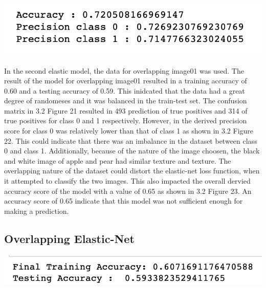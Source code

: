 \documentclass[12pt]{article}
\begin{document}
\begin{multicols*}{2}
\begin{center}
		\includegraphics[scale=0.5]{../screenshot/Non-Overlapping-Elastic-results/calc_score.png}
  \end{center}


  \hspace*{10mm} In the second elastic model, the data for overlapping image01 was used. The result of the model for overlapping
  image01 resulted in a training accuracy of 0.60 and a testing accuracy of 0.59. This inidcated that the data had a great degree of
  randomeses and it was balanced in the train-test set. The confusion matrix in 3.2 Figure 21 resulted in 493 prediction of true positives 
  and 314 of true positives for class 0 and 1 respectively. However, in the derived precision score for class 0 was relatively lower than that
  of class 1 as shown in 3.2 Figure 22. This could indicate that there was an imbalance in the dataset between class 0 and class 1. Additionally, because of the nature of the
  image choosen, the black and white image of apple and pear had similar texture and texture. The overlapping nature of the dataset could distort the elastic-net loss function, 
  when it attempted to classify the two images. This also impacted the overall dervied accuracy score of the model with a value of 0.65 as shown in 
  3.2 Figure 23. An accuracy score of 0.65 indicate that this model was not sufficient enough for making a prediction. 

  \subsection{Overlapping Elastic-Net} 
  \begin{center}
		\includegraphics[scale=0.5]{../screenshot/Overlapping-Elastic-results/results.png}


\end{center}
\end{multicols*}
\end{document}
